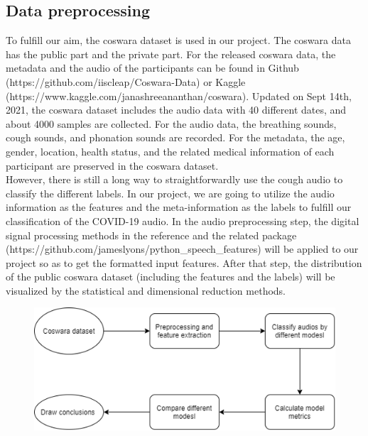 \documentclass[11pt]{article}
\begin{document}
\subsection{Data preprocessing}
To fulfill our aim, the coswara dataset \cite{sharma2020coswara} is used in our project. The coswara data has the public part and the private part. For the released coswara data, the metadata and the audio of the participants can be found in Github (https://github.com/iiscleap/Coswara-Data) or Kaggle
(https://www.kaggle.com/janashreeananthan/coswara). Updated on Sept 14th, 2021, the coswara
dataset includes the audio data with 40 different dates, and about 4000 samples are collected.
For the audio data, the breathing sounds, cough sounds, and phonation sounds are recorded.
For the metadata, the age, gender, location, health status, and the related medical information of each participant are preserved in the coswara dataset.\\

\noindent
However, there is still a long way to straightforwardly use the cough audio to classify the different labels. In our project, we are going to utilize the audio information as the
features and the meta-information as the labels to fulfill our classification of the COVID-19
audio. In the audio preprocessing step, the digital signal processing methods in the reference \cite{mohammed2021ensemble} and the related package (https://github.com/jameslyons/python\_speech\_features) will be applied to our project so as to get the formatted input features. After that step, the distribution of the public coswara dataset (including the features and the labels) will be visualized by the statistical and dimensional reduction methods.  \\
\begin{figure}[htbp]
    \centering
    \includegraphics[width=.8\textwidth]{jiabao.png} %
    \label{fig_methyltech}
 \end{figure}
\end{document}
